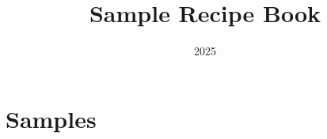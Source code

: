 \documentclass[a4paper,12pt]{book}
\title{Sample Recipe Book}
\author{}
\date{2025}
\begin{document}
\maketitle
\frontmatter

\tableofcontents

\mainmatter
\chapter{Samples}


\backmatter



\printindex
\end{document}
